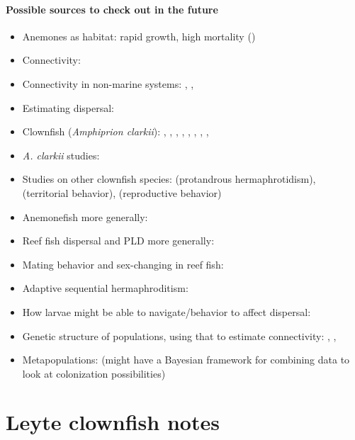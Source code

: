 \documentclass[12pt, oneside]{article}   	%
\begin{document}
\paragraph*{Possible sources to check out in the future}
\begin{itemize}
	\item Anemones as habitat: rapid growth, high mortality (\cite{o2018giant})
\item Connectivity: 
\item Connectivity in non-marine systems: \cite{nathan2000spatial}, \cite{jordano2007differential}, \cite{nathan2008mechanisms}
\item Estimating dispersal: \cite{taylor2000evaluating}
\item Clownfish (\textit{Amphiprion clarkii}): \cite{srinivasan1999experimental}, \cite{bell1976notes}, \cite{moyer1980influence}, \cite{fricke1983social}, \cite{fricke1977monogamy}, \cite{moyer1976geographical}, \cite{moyer1976reproductive}, \cite{ochi1985temporal}, \cite{yanagisawa1986step} 
\item \textit{A. clarkii} studies:
\item Studies on other clownfish species: \cite{moyer1978protandrous} (protandrous hermaphrotidism), \cite{moyer1973territorial} (territorial behavior), \cite{ross1978reproductive} (reproductive behavior)
\item Anemonefish more generally: \cite{fautin1986anemonefishes}
\item Reef fish dispersal and PLD more generally: \cite{brothers1985pelagic}
\item Mating behavior and sex-changing in reef fish: \cite{warner1984mating}
\item Adaptive sequential hermaphroditism: \cite{warner1975adaptive}
\item How larvae might be able to navigate/behavior to affect dispersal: \cite{leis2011nemo}
\item Genetic structure of populations, using that to estimate connectivity: \cite{selkoe2014emergent}, \cite{selkoe2010taking}, \cite{selkoe2006current}
\item Metapopulations: \cite{gaggiotti2004combining} (might have a Bayesian framework for combining data to look at colonization possibilities)
\end{itemize}

\section*{Leyte clownfish notes}
\end{document}
